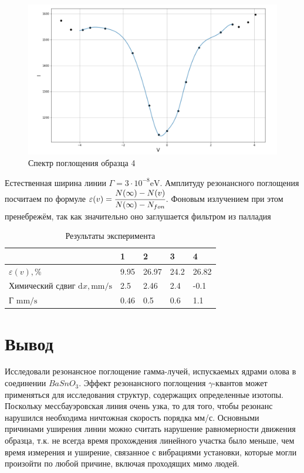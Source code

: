\documentclass[a4paper,12pt]{article}
\newcommand{\eps}{\varepsilon}
\newcommand{\dif}{\mathrm{d}}
\begin{document}
				\begin{figure}[h!]
					\centering
					\includegraphics[width=0.95\linewidth]{4obr}
					\caption{Спектр поглощения образца 4}
				\end{figure}
		
		\newpage
		
 Естественная ширина линии $\Gamma = 3\cdot10^{-8}\mathrm{eV}$. Амплитуду резонансного поглощения посчитаем по формуле $\eps(v) = \cfrac{N(\infty)-N(v)}{N(\infty)-N_{fon}}$. Фоновым излучением при этом пренебрежём, так как значительно оно заглушается фильтром из палладия
		
		\begin{table}[h!]
			\centering
			\caption{Результаты эксперимента}
			\label{my-label}
			\begin{tabular}{|l|l|l|l|l|}
				\hline
				& 1 & 2 & 3&4 \\ \hline
				$\eps(v), \%$ &9.95   & 26.97  &24.2 & 26.82  \\ \hline
				Химический сдвиг $\dif x, \mathrm{mm/s}$      & 2.5  & 2.46  &2.4& -0.1  \\ \hline
				Г  $\mathrm{mm/s}$    & 0.46  & 0.5  &0.6 &  1.1 \\ \hline
			\end{tabular}
		\end{table}
	

		
	\section{Вывод}
	 Исследовали резонансное поглощение гамма-лучей, испускаемых ядрами олова в соединении $BaSnO_3$. Эффект резонансного поглощения $\gamma$-квантов может применяться для исследования структур, содержащих определенные изотопы. Поскольку мессбауэровская линия очень узка, то для того, чтобы резонанс нарушился необходима ничтожная скорость порядка мм/с. Основными причинами уширения линии можно считать нарушение равномерности движения образца, т.к. не всегда время прохождения линейного участка было меньше, чем время измерения и уширение, связанное с вибрациями установки, которые могли произойти по любой причине, включая проходящих мимо людей.
\end{document}
